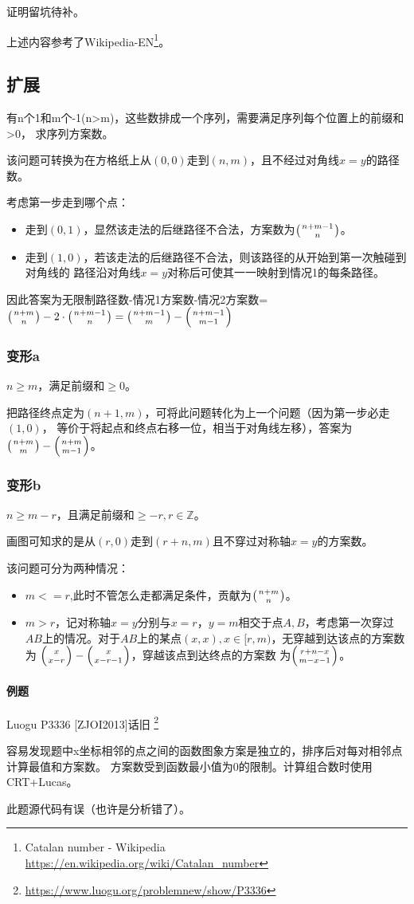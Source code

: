 证明留坑待补。

上述内容参考了Wikipedia-EN\footnote{Catalan number - Wikipedia
	\url{https://en.wikipedia.org/wiki/Catalan\_number}}。
\subsection{扩展}
有n个1和m个-1(n>m)，这些数排成一个序列，需要满足序列每个位置上的前缀和>0，
求序列方案数。

该问题可转换为在方格纸上从$(0,0)$走到$(n,m)$，且不经过对角线$x=y$的路径数。

考虑第一步走到哪个点：
\begin{itemize}
	\item 走到$(0,1)$，显然该走法的后继路径不合法，方案数为$\left(n+m-1 \atop n\right)$。
	\item 走到$(1,0)$，若该走法的后继路径不合法，则该路径的从开始到第一次触碰到对角线的
	路径沿对角线$x=y$对称后可使其一一映射到情况1的每条路径。
\end{itemize}

因此答案为无限制路径数-情况1方案数-情况2方案数=$\left(n+m \atop n\right)-
2\cdot\left(n+m-1 \atop n\right)=\left(n+m-1 \atop m\right)-\left(n+m-1 \atop m-1\right)$
\subsubsection{变形a}
$n\geq m$，满足前缀和$\geq 0$。

把路径终点定为$(n+1,m)$，可将此问题转化为上一个问题（因为第一步必走$(1,0)$，
等价于将起点和终点右移一位，相当于对角线左移），答案为
$\left(n+m \atop m\right)-\left(n+m \atop m-1\right)$。
\subsubsection{变形b}
$n\geq m-r$，且满足前缀和$\geq -r,r\in \mathbb{Z}$。

画图可知求的是从$(r,0)$走到$(r+n,m)$且不穿过对称轴$x=y$的方案数。

该问题可分为两种情况：
\begin{itemize}
	\item $m<=r$,此时不管怎么走都满足条件，贡献为$\left(n+m \atop n\right)$。
	\item $m>r$，记对称轴$x=y$分别与$x=r$，$y=m$相交于点$A,B$，考虑第一次穿过
	$AB$上的情况。对于$AB$上的某点$(x,x),x\in [r,m)$，无穿越到达该点的方案数为
	$\left(x \atop x-r\right)-\left(x \atop x-r-1\right)$，穿越该点到达终点的方案数
	为$\left(r+n-x \atop m-x-1\right)$。
\end{itemize}

\paragraph{例题}
Luogu P3336 [ZJOI2013]话旧
\footnote{\url{https://www.luogu.org/problemnew/show/P3336}}

容易发现题中x坐标相邻的点之间的函数图象方案是独立的，排序后对每对相邻点计算最值和方案数。
方案数受到函数最小值为0的限制。计算组合数时使用CRT+Lucas。

此题源代码有误（也许是分析错了）。


